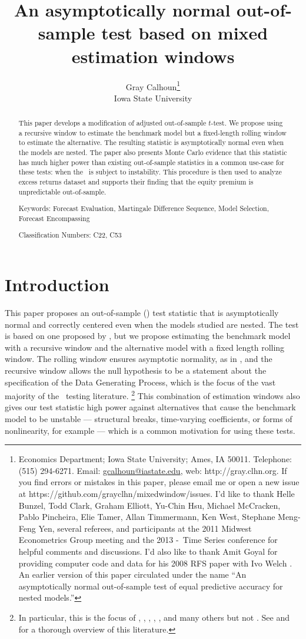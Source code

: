 \documentclass[12pt,fleqn]{article}
\author{Gray Calhoun\thanks{Economics Department; Iowa State
    University; Ames, IA 50011.  Telephone: (515) 294-6271.  Email:
    \guillemotleft \protect\url{gcalhoun@iastate.edu}\guillemotright,
    web: \guillemotleft http://gray.clhn.org\guillemotright.
    If you find errors or mistakes in this paper, please email me or
    open a new issue at
    \guillemotleft https://github.com/grayclhn/mixedwindow/issues\guillemotright.
    I'd like to
    thank Helle Bunzel, Todd Clark, Graham Elliott, Yu-Chin Hsu,
    Michael McCracken, Pablo Pincheira, Elie Tamer, Allan Timmermann, Ken West, Stephane
    Meng-Feng Yen, several referees, and participants at the 2011 Midwest Econometrics
    Group meeting and the 2013 \nber-\nsf\ Time Series conference
    for helpful comments and discussions.  I'd also like to thank Amit
    Goyal for providing computer code and data for his 2008
    RFS paper with Ivo Welch \citep{GoW:08}. An earlier version of this paper
    circulated under the name ``An asymptotically normal out-of-sample
  test of equal predictive accuracy for nested models.''}\\%
  Iowa State University}
\title{An asymptotically normal out-of-sample test based on
  mixed estimation windows}
\begin{document}
\maketitle

\begin{abstract}
  \noindent This paper develops a modification of  adjusted out-of-sample $t$-test. We propose
  using a recursive window to estimate the benchmark model but a
  fixed-length rolling window to estimate the alternative. The
  resulting statistic is asymptotically normal even when the models
  are nested. The
  paper also presents Monte Carlo evidence that this statistic has
  much higher power than existing out-of-sample statistics in a common
  use-case for these tests: when the \dgp\ is subject to instability.
  This procedure is then used to analyze
   excess returns dataset
  and supports their finding that the equity premium is unpredictable
  out-of-sample.

\strut

\noindent Keywords: Forecast Evaluation, Martingale Difference
Sequence, Model Selection, Forecast Encompassing

\strut

\noindent {} Classification Numbers: C22, C53

\end{abstract}
\newpage
\markboth{}{}
\tableofcontents
\newpage

\section{Introduction}

This paper proposes an out-of-sample (\oos) test statistic that is
asymptotically normal and correctly centered even when the models
studied are nested. The test is based on one proposed by
\citet{ClW:06,ClW:07}, but we propose estimating the benchmark model
with a recursive window and the alternative model with a fixed length
rolling window. The rolling window ensures asymptotic normality, as in
\citet{GiW:06}, and the recursive window allows the null hypothesis to
be a statement about the specification of the Data Generating Process,
which is the focus of the vast majority of the \oos\ testing
literature.%
\footnote{In particular, this is the focus of \citet{Wes:96},
  \citet{ClM:01}, \citet{Mcc:07}, \citet{ClW:06}, \citet{ClW:07}, and
  many others but not \citet{GiW:06}. See \citet{Wes:06} and
  \citet{ClM:13} for a thorough overview of this literature.} %
This combination of estimation windows also gives our test statistic
high power against alternatives that cause the benchmark model
to be unstable --- structural breaks, time-varying coefficients, or
forms of nonlinearity, for example --- which is a common motivation
for using these tests.
\end{document}
